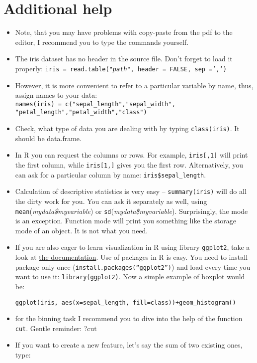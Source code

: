 \documentclass{article}
\begin{document}
\section*{Additional help}
\begin{itemize}
\item Note, that you may have problems with copy-paste from the pdf to the editor, I recommend you to type the commands yourself. 
\item The iris dataset has no header in the source file. Don't forget to load it properly: \texttt{iris = read.table(\emph{"path"}, header = FALSE, sep =',')}
\item However, it is more convenient to refer to a particular variable by name, thus, assign names to your data:\\
\texttt{names(iris) = c("sepal\_length","sepal\_width",\\"petal\_length","petal\_width","class")} 
\item Check, what type of data you are dealing with by typing \texttt{class(iris)}. It should be data.frame.
\item In R you can request the columns or rows. For example, \texttt{iris[,1]} will print the first column, while \texttt{iris[1,]} gives you the first row. Alternatively, you can ask for a particular column by name: \texttt{iris\$sepal\_length}.
\item Calculation of descriptive statistics is very easy -- \texttt{summary(iris)} will do all the dirty work for you. You can ask it separately as well, using \texttt{mean}(\emph{mydata\$myvariable}) or \texttt{sd}(\emph{mydata\$myvariable}). Surprisingly, the mode is an exception. Function mode will print you something like the storage mode of an object. It is not what you need.
\item If you are also eager to learn  visualization in R using library \texttt{ggplot2}, take a look at \href{http://docs.ggplot2.org/current/}{the documentation}. Use of packages in R is easy. You need to install package only once (\texttt{install.packages(``ggplot2'')}) and load every time you want to use it: \texttt{library(ggplot2)}. Now a simple example of boxplot would be:
\begin{lstlisting}
ggplot(iris, aes(x=sepal_length, fill=class))+geom_histogram()
\end{lstlisting}
\item for the binning task I recommend you to dive into the help of the function \texttt{cut}. Gentle reminder: ?cut 
\item If you want to create a new feature, let's say the sum of two existing ones, type: 

\end{itemize}
\end{document}
